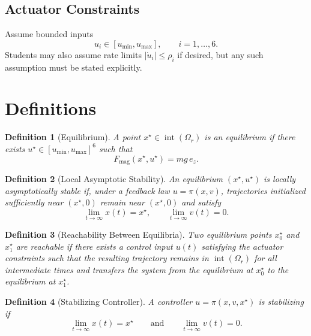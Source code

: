 \documentclass[11pt]{article}
\newtheorem{definition}{Definition}
\begin{document}
\subsection{Actuator Constraints}
Assume bounded inputs
\[
 u_i\in[u_{\min},u_{\max}], \qquad i=1,\dots,6.
\]
Students may also assume rate limits $|\dot u_i|\leq \rho_i$ if desired, but any such assumption must be stated explicitly.

\section{Definitions}

\begin{definition}[Equilibrium]
A point $x^\star\in\operatorname{int}(\Omega_r)$ is an equilibrium if there exists $u^\star\in [u_{\min},u_{\max}]^6$ such that
\[
F_{\mathrm{mag}}(x^\star,u^\star)=mg\,e_z.
\]
\end{definition}

\begin{definition}[Local Asymptotic Stability]
An equilibrium $(x^\star,u^\star)$ is locally asymptotically stable if, under a feedback law $u=\pi(x,v)$, trajectories initialized sufficiently near $(x^\star,0)$ remain near $(x^\star,0)$ and satisfy
\[
\lim_{t\to\infty} x(t)=x^\star,
\qquad
\lim_{t\to\infty} v(t)=0.
\]
\end{definition}

\begin{definition}[Reachability Between Equilibria]
Two equilibrium points $x_0^\star$ and $x_1^\star$ are reachable if there exists a control input $u(t)$ satisfying the actuator constraints such that the resulting trajectory remains in $\operatorname{int}(\Omega_r)$ for all intermediate times and transfers the system from the equilibrium at $x_0^\star$ to the equilibrium at $x_1^\star$.
\end{definition}

\begin{definition}[Stabilizing Controller]
A controller $u=\pi(x,v,x^\star)$ is stabilizing if
\[
\lim_{t\to\infty}x(t)=x^\star
\qquad\text{and}\qquad
\lim_{t\to\infty}v(t)=0.
\]
\end{definition}
\end{document}

